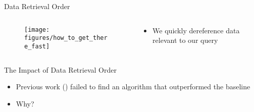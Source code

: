 \begin{frame}{Data Retrieval Order}
    \begin{columns}[T] %
        \begin{column}{.48\textwidth}

       \begin{figure}
            \centering
            \texttt{[image: figures/how\_to\_get\_there\_fast]}
        \end{figure}

        \end{column}%
        \hfill%
        \begin{column}{.48\textwidth}
            \bigskip
            \begin{itemize}
                \item We quickly dereference data relevant to our query
            \end{itemize}
        \end{column}%
    \end{columns}
\end{frame}


\begin{frame}{The Impact of Data Retrieval Order}
    \begin{itemize}
        \item Previous work (\textcite{hartig2016walking}) failed to find an algorithm that outperformed the baseline
        \item Why?
    \end{itemize}
\end{frame}
